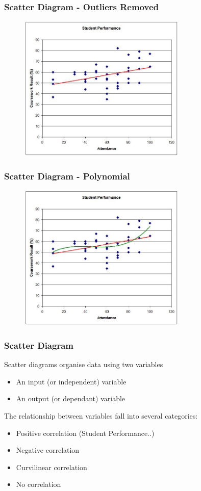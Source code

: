 \begin{frame}
\frametitle{Scatter Diagram - Outliers Removed}
\begin{figure}
	\centering
		\includegraphics[width = 8cm]{images/scattertrend2.jpg}
	\label{fig:studentc}
\end{figure}
\end{frame}






\begin{frame}
\frametitle{Scatter Diagram - Polynomial}
\begin{figure}
	\centering
		\includegraphics[width = 8cm]{images/scattertrend3.jpg}
	\label{fig:studentd}
\end{figure}
\end{frame}




\begin{frame}
\frametitle{Scatter Diagram}
Scatter diagrams organise data using two variables
\begin{itemize}
	\item An input (or independent) variable
	\item An output (or dependant) variable
\end{itemize}
The relationship between variables fall into several categories:
\begin{itemize}
	\item Positive correlation (Student Performance..)
	\item Negative correlation
	\item Curvilinear correlation
	\item No correlation
\end{itemize}
\end{frame}




